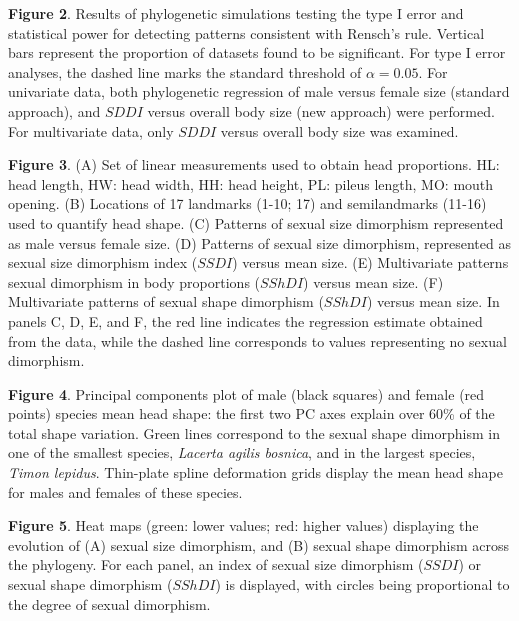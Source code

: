 \documentclass[]{article}
\begin{document}
\textbf{Figure 2}. Results of phylogenetic simulations testing the type
I error and statistical power for detecting patterns consistent with
Rensch's rule. Vertical bars represent the proportion of datasets found
to be significant. For type I error analyses, the dashed line marks the
standard threshold of \(\alpha= 0.05\). For univariate data, both
phylogenetic regression of male versus female size (standard approach),
and \(SDDI\) versus overall body size (new approach) were performed. For
multivariate data, only \(SDDI\) versus overall body size was examined.
\hfill\break

\textbf{Figure 3}. (A) Set of linear measurements used to obtain head
proportions. HL: head length, HW: head width, HH: head height, PL:
pileus length, MO: mouth opening. (B) Locations of 17 landmarks (1-10;
17) and semilandmarks (11-16) used to quantify head shape. (C) Patterns
of sexual size dimorphism represented as male versus female size. (D)
Patterns of sexual size dimorphism, represented as sexual size
dimorphism index (\(SSDI\)) versus mean size. (E) Multivariate patterns
sexual dimorphism in body proportions (\(SShDI\)) versus mean size. (F)
Multivariate patterns of sexual shape dimorphism (\(SShDI\)) versus mean
size. In panels C, D, E, and F, the red line indicates the regression
estimate obtained from the data, while the dashed line corresponds to
values representing no sexual dimorphism. \hfill\break

\textbf{Figure 4}. Principal components plot of male (black squares) and
female (red points) species mean head shape: the first two PC axes
explain over 60\% of the total shape variation. Green lines correspond
to the sexual shape dimorphism in one of the smallest species,
\emph{Lacerta agilis bosnica}, and in the largest species, \emph{Timon
lepidus}. Thin-plate spline deformation grids display the mean head
shape for males and females of these species. \hfill\break

\textbf{Figure 5}. Heat maps (green: lower values; red: higher values)
displaying the evolution of (A) sexual size dimorphism, and (B) sexual
shape dimorphism across the phylogeny. For each panel, an index of
sexual size dimorphism (\(SSDI\)) or sexual shape dimorphism (\(SShDI\))
is displayed, with circles being proportional to the degree of sexual
dimorphism. \hfill\break

\newpage
\end{document}
